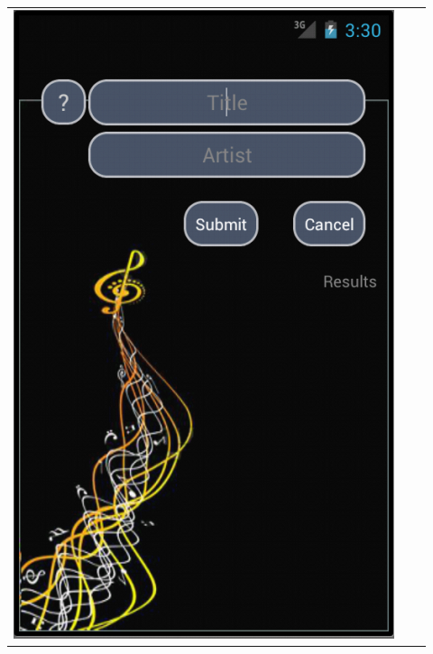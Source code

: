 \documentclass[11pt,a4paper]{article}
\begin{document}
	\begin{tabular}{l l l}
	
	\includegraphics[scale=0.4]{GUI_0124_startscreen.png} &	

\end{tabular}
\end{document}
